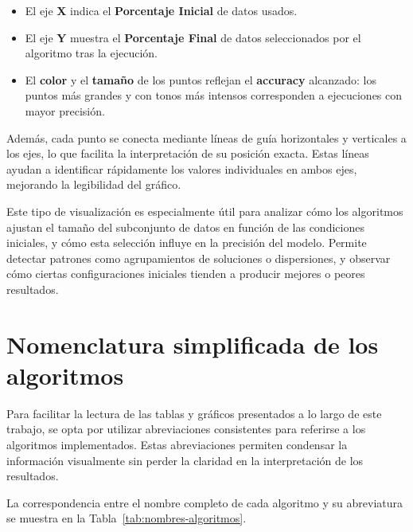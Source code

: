 \begin{itemize}
    \item El eje \textbf{X} indica el \textbf{Porcentaje Inicial} de datos usados.
    \item El eje \textbf{Y} muestra el \textbf{Porcentaje Final} de datos seleccionados por el algoritmo tras la ejecución.
    \item El \textbf{color} y el \textbf{tamaño} de los puntos reflejan el \textbf{accuracy} alcanzado: los puntos más grandes 
    y con tonos más intensos corresponden a ejecuciones con mayor precisión.
\end{itemize}

Además, cada punto se conecta mediante líneas de guía horizontales y verticales a los ejes, lo que facilita la interpretación de su posición exacta.
Estas líneas ayudan a identificar rápidamente los valores individuales en ambos ejes, mejorando la legibilidad del gráfico.

Este tipo de visualización es especialmente útil para analizar cómo los algoritmos ajustan el tamaño del subconjunto de datos en función de las condiciones iniciales, 
y cómo esta selección influye en la precisión del modelo.
Permite detectar patrones como agrupamientos de soluciones o dispersiones, y observar cómo ciertas configuraciones iniciales tienden a producir mejores o peores resultados.


\section{Nomenclatura simplificada de los algoritmos}\label{subsec:nomenclatura-algoritmos}
Para facilitar la lectura de las tablas y gráficos presentados a lo largo de este trabajo,
se opta por utilizar abreviaciones consistentes para referirse a los algoritmos implementados.
Estas abreviaciones permiten condensar la información visualmente sin perder la claridad en la interpretación de los resultados.

La correspondencia entre el nombre completo de cada algoritmo y su abreviatura se muestra en la Tabla~\ref{tab:nombres-algoritmos}.

